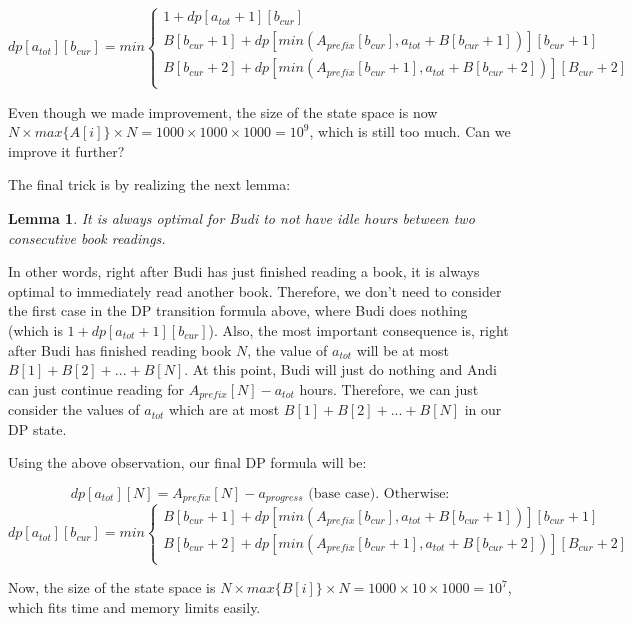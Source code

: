 \documentclass[12pt]{article}
\newtheorem{lemma}{Lemma}
\begin{document}
\[
dp[a_{tot}][b_{cur}] = min 
\begin{cases}
  1 + dp[a_{tot}+1][b_{cur}] \\
  B[b_{cur}+1] + dp[min(A_{prefix}[b_{cur}], a_{tot}+B[b_{cur}+1])][b_{cur}+1] \\
  B[b_{cur}+2] + dp[min(A_{prefix}[b_{cur}+1], a_{tot}+B[b_{cur}+2])][B_{cur}+2] \\
\end{cases}
\]


Even though we made improvement, the size of the state space is now $N \times max\{A[i]\} \times N = 1000 \times 1000 \times 1000 = 10^{9}$, which is still too much. Can we improve it further?

The final trick is by realizing the next lemma:

\begin{lemma}
  It is always optimal for Budi to not have idle hours between two consecutive book readings.
\end{lemma}

In other words, right after Budi has just finished reading a book, it is always optimal to immediately read another book. Therefore, we don't need to consider the first case in the DP transition formula above, where Budi does nothing (which is $1 + dp[a_{tot}+1][b_{cur}]$). Also, the most important consequence is, right after Budi has finished reading book $N$, the value of $a_{tot}$ will be at most $B[1] + B[2] + ... + B[N]$. At this point, Budi will just do nothing and Andi can just continue reading for $A_{prefix}[N] - a_{tot}$ hours. Therefore, we can just consider the values of $a_{tot}$ which are at most $B[1] + B[2] + ... + B[N]$ in our DP state.

Using the above observation, our final DP formula will be:

\[
dp[a_{tot}][N] = A_{prefix}[N] - a_{progress} \text{ (base case). Otherwise:}
\]
\[
dp[a_{tot}][b_{cur}] = min
\begin{cases}
  B[b_{cur}+1] + dp[min(A_{prefix}[b_{cur}], a_{tot}+B[b_{cur}+1])][b_{cur}+1] \\
  B[b_{cur}+2] + dp[min(A_{prefix}[b_{cur}+1], a_{tot}+B[b_{cur}+2])][B_{cur}+2] \\
\end{cases}
\]

Now, the size of the state space is $N \times max\{B[i]\} \times N = 1000 \times 10 \times 1000 = 10^{7}$, which fits time and memory limits easily.
\end{document}
